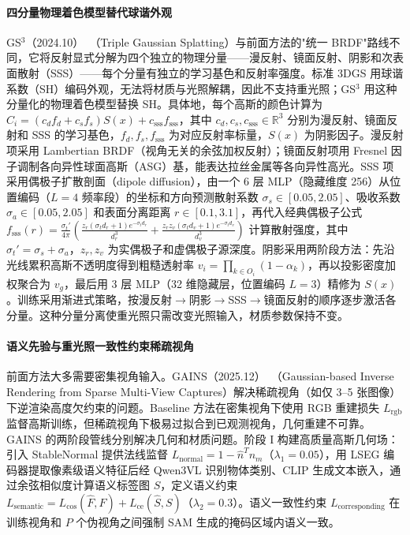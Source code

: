 \paragraph{四分量物理着色模型替代球谐外观}

GS$^3$（2024.10）~\cite{2410_11419}（Triple Gaussian Splatting）与前面方法的"统一 BRDF"路线不同，它将反射显式分解为四个独立的物理分量——漫反射、镜面反射、阴影和次表面散射（SSS）——每个分量有独立的学习基色和反射率强度。标准 3DGS 用球谐系数（SH）编码外观，无法将材质与光照解耦，因此不支持重光照；GS$^3$ 用这种分量化的物理着色模型替换 SH。具体地，每个高斯的颜色计算为 $C_i = (c_d f_d + c_s f_s) S(x) + c_{\text{sss}} f_{\text{sss}}$，其中 $c_d, c_s, c_{\text{sss}} \in \mathbb{R}^3$ 分别为漫反射、镜面反射和 SSS 的学习基色，$f_d, f_s, f_{\text{sss}}$ 为对应反射率标量，$S(x)$ 为阴影因子。漫反射项采用 Lambertian BRDF（视角无关的余弦加权反射）；镜面反射项用 Fresnel 因子调制各向异性球面高斯（ASG）基，能表达拉丝金属等各向异性高光。SSS 项采用偶极子扩散剖面（dipole diffusion），由一个 6 层 MLP（隐藏维度 256）从位置编码（$L=4$ 频率段）的坐标和方向预测散射系数 $\sigma_s \in [0.05, 2.05]$、吸收系数 $\sigma_a \in [0.05, 2.05]$ 和表面分离距离 $r \in [0.1, 3.1]$，再代入经典偶极子公式 $f_{\text{sss}}(r) = \frac{\sigma_t'}{4\pi}\!\left(\frac{z_r(\sigma_t d_r + 1)e^{-\sigma_t d_r}}{d_r^3} + \frac{z_r z_v(\sigma_t d_v + 1)e^{-\sigma_t d_v}}{d_v^3}\right)$ 计算散射强度，其中 $\sigma_t' = \sigma_s + \sigma_a$，$z_r, z_v$ 为实偶极子和虚偶极子源深度。阴影采用两阶段方法：先沿光线累积高斯不透明度得到粗糙透射率 $v_i = \prod_{k \in O_i}(1-\alpha_k)$，再以投影密度加权聚合为 $v_g$，最后用 3 层 MLP（32 维隐藏层，位置编码 $L=3$）精修为 $S(x)$。训练采用渐进式策略，按漫反射$\to$阴影$\to$SSS$\to$镜面反射的顺序逐步激活各分量。这种分量分离使重光照只需改变光照输入，材质参数保持不变。

\paragraph{语义先验与重光照一致性约束稀疏视角}

前面方法大多需要密集视角输入。GAINS（2025.12）~\cite{2512_09925}（Gaussian-based Inverse Rendering from Sparse Multi-View Captures）解决稀疏视角（如仅 3--5 张图像）下逆渲染高度欠约束的问题。Baseline 方法在密集视角下使用 RGB 重建损失 $L_{\text{rgb}}$ 监督高斯训练，但稀疏视角下极易过拟合到已观测视角，几何重建不可靠。GAINS 的两阶段管线分别解决几何和材质问题。阶段 I 构建高质量高斯几何场：引入 StableNormal 提供法线监督 $L_{\text{normal}} = 1 - \hat{n}^T n_m$（$\lambda_1=0.05$），用 LSEG 编码器提取像素级语义特征后经 Qwen3VL 识别物体类别、CLIP 生成文本嵌入，通过余弦相似度计算语义标签图 $S$，定义语义约束 $L_{\text{semantic}} = L_{\text{cos}}(\hat{F}, F) + L_{\text{ce}}(\hat{S}, S)$（$\lambda_2=0.3$）。语义一致性约束 $L_{\text{corresponding}}$ 在训练视角和 $P$ 个伪视角之间强制 SAM 生成的掩码区域内语义一致。

